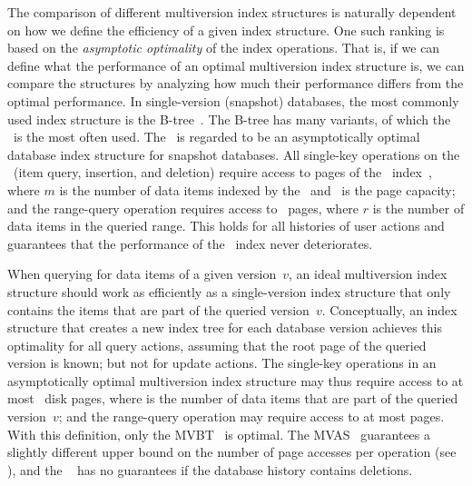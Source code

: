 The comparison of different multiversion index structures is
naturally dependent on how we define the efficiency of a given index
structure. 
One such ranking is based on the \emph{asymptotic optimality} of the
index operations.
That is, if we can define what the performance of an optimal
multiversion index structure is, we can compare the structures by
analyzing how much their performance differs from the optimal
performance.
In single-version (snapshot) databases, the most commonly used index
structure is the 
B-tree~\cite{bayer:1972:btree,bayer:1977:btree-concurrency,comer:1979:btree}. 
The B-tree has many variants, of which the \Btree\ is the most
often used.
The \Btree\ is regarded to be an asymptotically optimal database
index structure for snapshot databases.
All single-key operations on the \Btree\ (item query, insertion, and
deletion) require access to  pages of the \Btree\
index~\cite{comer:1979:btree}, where $m$ is the number of data items indexed
by the \Btree\ and \capacity\ is the page capacity; and the range-query
operation requires access to \OhT{\log_\capacity m + r/\capacity} \Btree\
pages, where $r$ is the number of data items in the queried range. 
This holds for all histories of user actions and guarantees that the
performance of the \Btree\ index never deteriorates.

When querying for data items of a given version~$v$, an ideal multiversion
index structure should work as efficiently as a single-version index
structure that only contains the items that are part of the queried
version~$v$.
Conceptually, an index structure that creates a new index tree for each
database version achieves this optimality for all query actions, assuming
that the root page of the queried version is known; but not for update actions.
The single-key operations in an asymptotically optimal multiversion index
structure may thus require access to at most \Oh{\log_\capacity
\entries{v}}~disk pages, where \entries{v} is the number of data items that
are part of the queried version~$v$; and the range-query operation may
require access to at most \Oh{\log_\capacity \entries{v} + r/\capacity}
pages. 
With this definition, only the
MVBT~\cite{becker:1993:optimal,becker:1996:mvbt} is optimal. 
The MVAS~\cite{varman:1997:multiversion} guarantees a slightly different
upper bound on the number of page accesses per operation (see
\secref{sec:tsbmvbt:mvas}), and the
\TSBtree~\cite{lomet:1989:tsb,lomet:1990:tsb-performance} has no guarantees if
the database history contains deletions.


